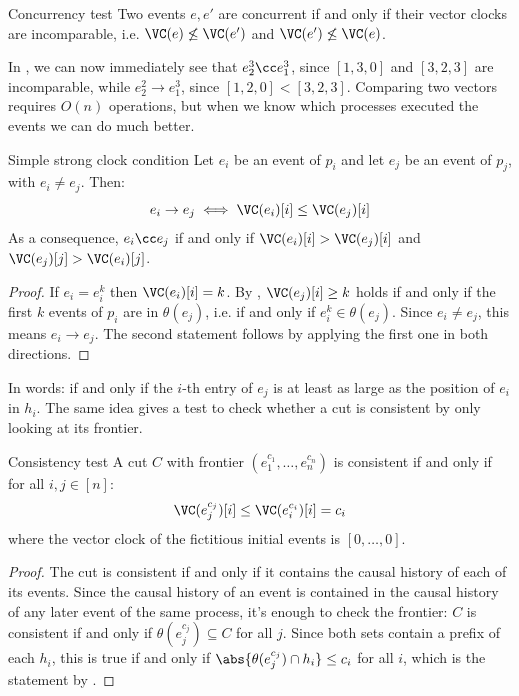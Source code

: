 \begin{framedcor}{Concurrency test}
  Two events $e,e'$ are concurrent if and only if their vector clocks are incomparable, i.e. $\VC(e) \not\leq \VC(e')$ and $\VC(e') \not\leq \VC(e)$.
\end{framedcor}

In , we can now immediately see that $e_2^3 \cc e_1^3$, since $[1,3,0]$ and $[3,2,3]$ are incomparable, while $e_2^2 \to e_1^3$, since $[1,2,0] < [3,2,3]$. Comparing two vectors requires $O(n)$ operations, but when we know which processes executed the events we can do much better.

\begin{framedprop}{Simple strong clock condition}
  Let $e_i$ be an event of $p_i$ and let $e_j$ be an event of $p_j$, with $e_i \neq e_j$. Then:
  \[e_i \to e_j \iff \VC(e_i)[i] \leq \VC(e_j)[i]\]
  As a consequence, $e_i \cc e_j$ if and only if $\VC(e_i)[i] > \VC(e_j)[i]$ and $\VC(e_j)[j] > \VC(e_i)[j]$.
\end{framedprop}

\begin{proof}
  If $e_i = e_i^k$ then $\VC(e_i)[i] = k$. By , $\VC(e_j)[i] \geq k$ holds if and only if the first $k$ events of $p_i$ are in $\theta(e_j)$, i.e. if and only if $e_i^k \in \theta(e_j)$. Since $e_i \neq e_j$, this means $e_i \to e_j$. The second statement follows by applying the first one in both directions.
\end{proof}

In words:  if and only if the $i$-th entry of $e_j$ is at least as large as the position of $e_i$ in $h_i$. The same idea gives a test to check whether a cut is consistent by only looking at its frontier.

\begin{framedprop}{Consistency test}
  A cut $C$ with frontier $(e_1^{c_1}, \ldots, e_n^{c_n})$ is consistent if and only if for all $i,j \in [n]$:
  \[\VC(e_j^{c_j})[i] \leq \VC(e_i^{c_i})[i] = c_i\]
  where the vector clock of the fictitious initial events is $[0, \ldots, 0]$.
\end{framedprop}

\begin{proof}
  The cut is consistent if and only if it contains the causal history of each of its events. Since the causal history of an event is contained in the causal history of any later event of the same process, it's enough to check the frontier: $C$ is consistent if and only if $\theta(e_j^{c_j}) \subseteq C$ for all $j$. Since both sets contain a prefix of each $h_i$, this is true if and only if $\abs{\theta(e_j^{c_j}) \cap h_i} \leq c_i$ for all $i$, which is the statement by .
\end{proof}


